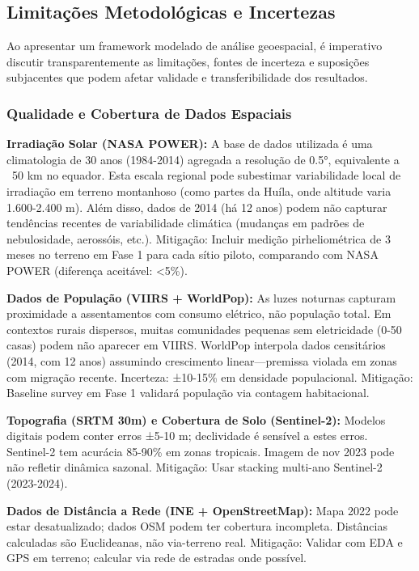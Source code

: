\documentclass[12pt, a4paper]{article}
\begin{document}
{{{{{{{{{{{{\subsection{Limitações Metodológicas e Incertezas}

Ao apresentar um framework modelado de análise geoespacial, é imperativo discutir transparentemente as limitações, fontes de incerteza e suposições subjacentes que podem afetar validade e transferibilidade dos resultados.

\subsubsection{Qualidade e Cobertura de Dados Espaciais}

\textbf{Irradiação Solar (NASA POWER):} A base de dados utilizada é uma climatologia de 30 anos (1984-2014) agregada a resolução de 0.5°, equivalente a ~50 km no equador. Esta escala regional pode subestimar variabilidade local de irradiação em terreno montanhoso (como partes da Huíla, onde altitude varia 1.600-2.400 m). Além disso, dados de 2014 (há 12 anos) podem não capturar tendências recentes de variabilidade climática (mudanças em padrões de nebulosidade, aerossóis, etc.). Mitigação: Incluir medição pirheliométrica de 3 meses no terreno em Fase 1 para cada sítio piloto, comparando com NASA POWER (diferença aceitável: <5\%).

\textbf{Dados de População (VIIRS + WorldPop):} As luzes noturnas capturam proximidade a assentamentos com consumo elétrico, não população total. Em contextos rurais dispersos, muitas comunidades pequenas sem eletricidade (0-50 casas) podem não aparecer em VIIRS. WorldPop interpola dados censitários (2014, com 12 anos) assumindo crescimento linear—premissa violada em zonas com migração recente. Incerteza: ±10-15\% em densidade populacional. Mitigação: Baseline survey em Fase 1 validará população via contagem habitacional.

\textbf{Topografia (SRTM 30m) e Cobertura de Solo (Sentinel-2):} Modelos digitais podem conter erros ±5-10 m; declividade é sensível a estes erros. Sentinel-2 tem acurácia 85-90\% em zonas tropicais. Imagem de nov 2023 pode não refletir dinâmica sazonal. Mitigação: Usar stacking multi-ano Sentinel-2 (2023-2024).

\textbf{Dados de Distância a Rede (INE + OpenStreetMap):} Mapa 2022 pode estar desatualizado; dados OSM podem ter cobertura incompleta. Distâncias calculadas são Euclideanas, não via-terreno real. Mitigação: Validar com EDA e GPS em terreno; calcular via rede de estradas onde possível.

}}}}}}}}}}}}
\end{document}
